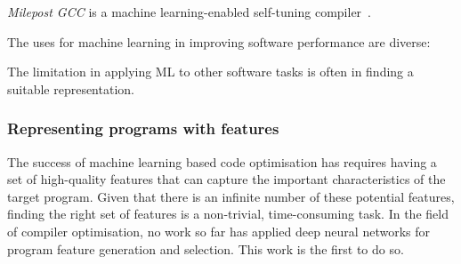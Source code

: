 \emph{Milepost GCC} is a machine learning-enabled self-tuning compiler~\cite{Fursin2011}.


The uses for machine learning in improving software performance are diverse:




The limitation in applying ML to other software tasks is often in finding a suitable representation.


\subsubsection{Representing programs with features}

The success of machine learning based code optimisation has requires having a set of high-quality features that can capture the important characteristics of the target program. Given that there is an infinite number of these potential features, finding the right set of features is a non-trivial, time-consuming task. In the field of compiler optimisation, no work so far has applied deep neural networks for program feature generation and selection. This work is the first to do so.


